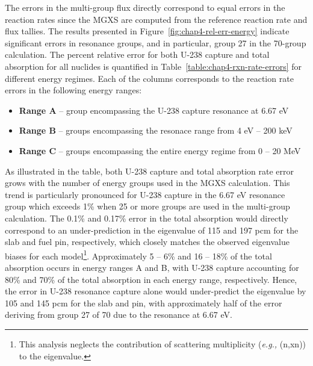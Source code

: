 The errors in the multi-group flux directly correspond to equal errors in the reaction rates since the \ac{MGXS} are computed from the reference reaction rate and flux tallies. The results presented in Figure~\ref{fig:chap4-rel-err-energy} indicate significant errors in resonance groups, and in particular, group 27 in the 70-group calculation. The percent relative error for both U-238 capture and total absorption for all nuclides is quantified in Table~\ref{table:chap4-rxn-rate-errors} for different energy regimes. Each of the columns corresponds to the reaction rate errors in the following energy ranges:

\vspace{-0.1in}
\begin{itemize}[noitemsep]
  \item {\bf Range A} -- group encompassing the U-238 capture resonance at 6.67 eV
  \item {\bf Range B} -- groups encompassing the resonace range from 4 eV -- 200 keV
  \item {\bf Range C} -- groups encompassing the entire energy regime from 0 -- 20 MeV
\end{itemize}
\vspace{-0.1in}

As illustrated in the table, both U-238 capture and total absorption rate error grows with the number of energy groups used in the \ac{MGXS} calculation. This trend is particularly pronounced for U-238 capture in the 6.67 eV resonance group which exceeds 1\% when 25 or more groups are used in the multi-group calculation. The 0.1\% and 0.17\% error in the total absorption would directly correspond to an under-prediction in the eigenvalue of 115 and 197 pcm for the slab and fuel pin, respectively, which closely matches the observed eigenvalue biases for each model\footnote{This analysis neglects the contribution of scattering multiplicity (\textit{e.g.,} (n,xn)) to the eigenvalue.}. Approximately 5 -- 6\% and 16 -- 18\% of the total absorption occurs in energy ranges A and B, with U-238 capture accounting for 80\% and 70\% of the total absorption in each energy range, respectively. Hence, the error in U-238 resonance capture alone would under-predict the eigenvalue by 105 and 145 pcm for the slab and pin, with approximately half of the error deriving from group 27 of 70 due to the resonance at 6.67 eV. 



